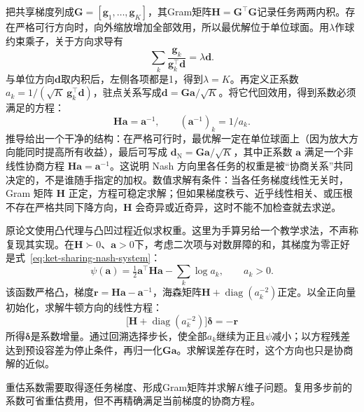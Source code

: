 把共享梯度列成$\bm G=[\bm g_1,\ldots,\bm g_K]$，其Gram矩阵$\bm H=\bm G^{\top}\bm G$记录任务两两内积。存在严格可行方向时，向外缩放增加全部效用，所以最优解位于单位球面。用$\lambda$作球约束乘子，关于方向求导有
\begin{equation}
  \sum_k\frac{\bm g_k}{\bm g_k^{\top}\bm d}
  =\lambda\bm d.
\end{equation}
与单位方向$\bm d$取内积后，左侧各项都是1，得到$\lambda=K$。再定义正系数$a_k=1/(\sqrt K\,\bm g_k^{\top}\bm d)$，驻点关系写成$\bm d=\bm G\bm a/\sqrt K$。将它代回效用，得到系数必须满足的方程：
\begin{equation}
  \bm H\bm a=\bm a^{-1},
  \qquad
  (\bm a^{-1})_k=1/a_k.
  \label{eq:ket-sharing-nash-system}
\end{equation}
推导给出一个干净的结构：在严格可行时，最优解一定在单位球面上（因为放大方向能同时提高所有收益），最后可写成 $\bm d_{\mathrm N}=\bm G\bm a/\sqrt K$，其中正系数 $\bm a$ 满足一个非线性协商方程 $\bm H\bm a=\bm a^{-1}$。这说明 Nash 方向里各任务的权重是被“协商关系”共同决定的，不是谁随手指定的加权。数值求解有条件：当各任务梯度线性无关时，Gram 矩阵 $\bm H$ 正定，方程可稳定求解；但如果梯度秩亏、近乎线性相关、或压根不存在严格共同下降方向，$\bm H$ 会奇异或近奇异，这时不能不加检查就去求逆。

原论文使用凸代理与凸凹过程近似求权重。这里为手算另给一个教学求法，不声称复现其实现。在$\bm H\succ0$、$\bm a>0$下，考虑二次项与对数屏障的和，其梯度为零正好是式~\eqref{eq:ket-sharing-nash-system}：
\begin{equation}
  \psi(\bm a)
  =\tfrac12\bm a^{\top}\bm H\bm a
   -\sum_k\log a_k,
  \qquad a_k>0.
  \label{eq:ket-sharing-nash-newton}
\end{equation}
该函数严格凸，梯度$\bm r=\bm H\bm a-\bm a^{-1}$，海森矩阵$\bm H+\operatorname{diag}(a_k^{-2})$正定。以全正向量初始化，求解牛顿方向的线性方程：
\[
  \bigl[\bm H+\operatorname{diag}(a_k^{-2})\bigr]
  \bm\delta=-\bm r
\]
所得$\bm\delta$是系数增量。通过回溯选择步长，使全部$a_k$继续为正且$\psi$减小；以方程残差达到预设容差为停止条件，再归一化$\bm G\bm a$。求解误差存在时，这个方向也只是协商解的近似。

重估系数需要取得逐任务梯度、形成Gram矩阵并求解$K$维子问题。复用多步前的系数可省重估费用，但不再精确满足当前梯度的协商方程。

